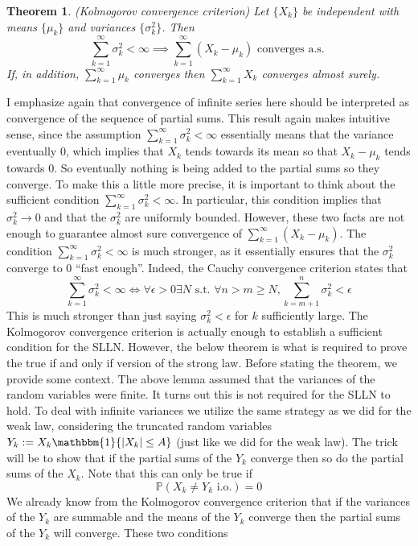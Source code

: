 \documentclass[12pt]{article}
\newcommand*{\abs}[1]{\left\lvert#1\right\rvert}
\newcommand{\Prob}{\mathbb{P}}
\newtheorem{thm}{Theorem}
\begin{document}
\begin{thm}
(Kolmogorov convergence criterion) Let $\{X_k\}$ be independent with means $\{\mu_k\}$ and variances $\{\sigma_k^2\}$. Then 
\[\sum_{k = 1}^{\infty} \sigma_k^2 < \infty \implies \sum_{k = 1}^{\infty} (X_k - \mu_k) \text{ converges a.s. }\]
If, in addition, $\sum_{k = 1}^{\infty} \mu_k$ converges then $\sum_{k = 1}^{\infty} X_k$ converges almost surely. 
\end{thm}
I emphasize again that convergence of infinite series here should be interpreted as convergence of the sequence of partial sums. This result again makes intuitive sense, since the assumption 
$\sum_{k = 1}^{\infty} \sigma_k^2 < \infty$ essentially means that the variance eventually $0$, which implies that $X_k$ tends towards its mean so that $X_k - \mu_k$ tends towards $0$. So eventually 
nothing is being added to the partial sums so they converge. To make this a little more precise, it is important to think about the sufficient condition $\sum_{k = 1}^{\infty} \sigma_k^2 < \infty$. In particular, 
this condition implies that $\sigma_k^2 \to 0$ and that the $\sigma_k^2$ are uniformly bounded. However, these two facts are not enough to guarantee almost sure convergence of $\sum_{k = 1}^{\infty} (X_k - \mu_k)$. 
The condition $\sum_{k = 1}^{\infty} \sigma_k^2 < \infty$ is much stronger, as it essentially ensures that the $\sigma_k^2$ converge to $0$ ``fast enough''. Indeed, the Cauchy convergence criterion states that 
\[\sum_{k = 1}^{\infty} \sigma_k^2 < \infty \iff \forall \epsilon > 0 \exists N \text{ s.t. } \forall n > m \geq N, \sum_{k = m + 1}^{n} \sigma_k^2 < \epsilon\]
This is much stronger than just saying $\sigma_k^2 < \epsilon$ for $k$ sufficiently large. The Kolmogorov convergence criterion is actually enough to establish a sufficient condition for the SLLN. However, the below theorem
is what is required to prove the true if and only if version of the strong law. Before stating the theorem, we provide some context. The above lemma assumed that the variances of the random variables were 
finite. It turns out this is not required for the SLLN to hold. To deal with infinite variances we utilize the same strategy as we did for the weak law, considering the truncated random variables
$Y_k := X_k \mathbbm{1}\{\abs{X_k} \leq A\}$ (just like we did for the weak law). The trick will be to show that if the partial sums of the $Y_k$ converge then so do the partial sums of the $X_k$. Note that this can only 
be true if 
\[\Prob(X_k \neq Y_k \text{ i.o.}) = 0\]
We already know from the Kolmogorov convergence criterion that if the variances of the $Y_k$ are summable and the means of the $Y_k$ converge then the partial sums of the $Y_k$ will converge. These two conditions
\end{document}
